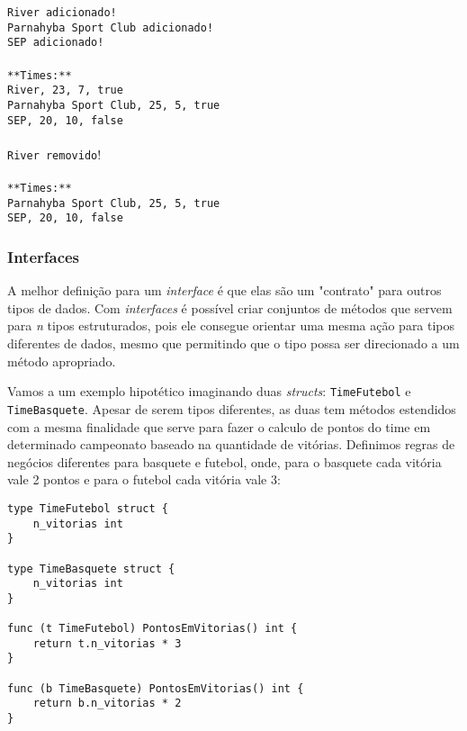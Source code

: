 \documentclass{SBCbookchapter}
\begin{document}
\noindent\texttt{River adicionado!}\\
\texttt{Parnahyba Sport Club adicionado!}\\
\texttt{SEP adicionado!}\\ \\
\texttt{**Times:**}\\
\texttt{River, 23, 7, true}\\
\texttt{Parnahyba Sport Club, 25, 5, true}\\
\texttt{SEP, 20, 10, false}\\ \\
\texttt{River removido}!\\ \\
\texttt{**Times:**}\\
\texttt{Parnahyba Sport Club, 25, 5, true}\\
\texttt{SEP, 20, 10, false}\\

\subsubsection{Interfaces}

A melhor definição para um \textit{interface} é que elas são um "contrato" para outros tipos de dados. Com \textit{interfaces} é possível criar conjuntos de métodos que servem para \textit{n} tipos estruturados, pois ele consegue orientar uma mesma ação para tipos diferentes de dados, mesmo que permitindo que o tipo possa ser direcionado a um método apropriado.

Vamos a um exemplo hipotético imaginando duas \textit{structs}: \texttt{TimeFutebol} e \texttt{TimeBasquete}. Apesar de serem tipos diferentes, as duas tem métodos estendidos com a mesma finalidade que serve para fazer o calculo de pontos do time em determinado campeonato baseado na quantidade de vitórias. Definimos regras de negócios diferentes para basquete e futebol, onde, para o basquete cada vitória vale 2 pontos e para o futebol cada vitória vale 3:

\begin{lstlisting}
type TimeFutebol struct {
	n_vitorias int
}

type TimeBasquete struct {
	n_vitorias int
}

func (t TimeFutebol) PontosEmVitorias() int {
	return t.n_vitorias * 3
}

func (b TimeBasquete) PontosEmVitorias() int {
	return b.n_vitorias * 2
}
\end{lstlisting}
\end{document}

